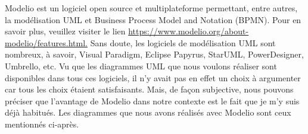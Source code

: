 Modelio est un logiciel open source et multiplateforme permettant, entre autres, la modélisation
UML et Business Process Model and Notation (BPMN). Pour en savoir plus, veuillez visiter le lien
\href{https://www.modelio.org/about-modelio/features.html.}{https://www.modelio.org/about-modelio/features.html.}
Sans doute, les logiciels de modélisation UML sont nombreux, à savoir, Visual Paradigm, Eclipse
Papyrus, StarUML, PowerDesigner, Umbrello, etc. Vu que les diagrammes UML que nous voulons
réaliser sont disponibles dans tous ces logiciels, il n’y avait pas en effet un choix à argumenter car
tous les choix étaient satisfaisants. Mais, de façon subjective, nous pouvons préciser que l’avantage de
Modelio dans notre contexte est le fait que je m’y suis déjà habitués. Les diagrammes que nous avons
réalisés avec Modelio sont ceux mentionnés ci-après.


